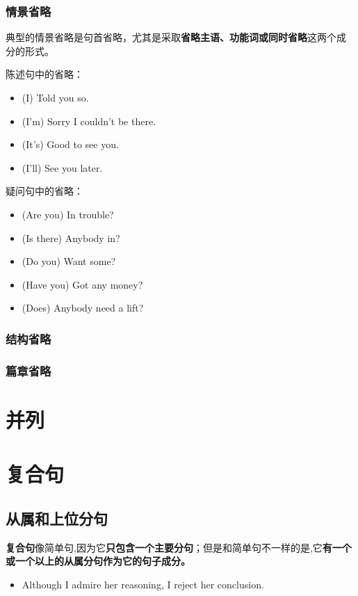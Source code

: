 \subsubsection{情景省略}

典型的情景省略是句首省略，尤其是采取\textbf{省略主语、功能词或同时省略}这两个成
分的形式。

陈述句中的省略：
\begin{itemize}
\item (I) Told you so.
\item (I'm) Sorry I couldn't be there.
\item (It's) Good to see you.
\item (I'll) See you later.
\end{itemize}

疑问句中的省略：
\begin{itemize}
\item (Are you) In trouble?
\item (Is there) Anybody in?
\item (Do you) Want some?
\item (Have you) Got any money?
\item (Does) Anybody need a lift?
\end{itemize}

\subsubsection{结构省略}
\subsubsection{篇章省略}


\section{并列}

\section{复合句}

\subsection{从属和上位分句}

\textbf{复合句}像简单句,因为它\textbf{只包含一个主要分句}；但是和简单句不一样的是,它\textbf{有一个
或一个以上的从属分句作为它的句子成分。}

\begin{itemize}
\item Although I admire her reasoning, I reject her conclusion.
\end{itemize}

